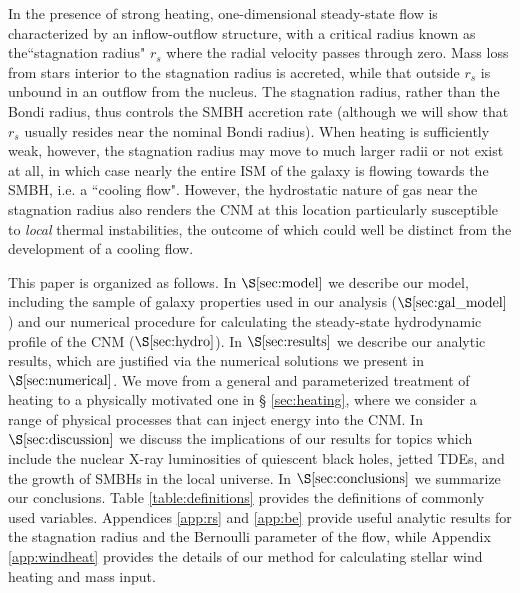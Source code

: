 \documentclass[usenatbib,fleqn]{mn2e}
\newcommand{\rs}{r_s}
\begin{document}
In the presence of strong heating, one-dimensional steady-state flow
is characterized by an inflow-outflow structure, with a critical
radius known as the``stagnation radius" $\rs$ where the radial
velocity passes through zero.  Mass loss from stars interior to the
stagnation radius is accreted, while that outside $\rs$ is unbound in
an outflow from the nucleus.  The stagnation radius, rather than the
Bondi radius, thus controls the SMBH accretion rate (although we will
show that $\rs$ usually resides near the nominal Bondi
radius).  When heating is sufficiently weak, however, the stagnation
radius may move to much larger radii or not exist at all, in which
case nearly the entire ISM of the galaxy is flowing towards the SMBH, i.e. a ``cooling flow".
However, the hydrostatic nature of gas near the stagnation radius also renders the CNM at this location particularly susceptible to {\it local} thermal instabilities, the outcome of which could well be distinct from the development of a cooling flow.       


This paper is organized as follows.  In $\S\ref{sec:model}$ we
describe our model, including the sample of galaxy properties used in
our analysis ($\S\ref{sec:gal_model}$) and our numerical procedure for
calculating the steady-state hydrodynamic profile of the CNM
($\S\ref{sec:hydro}$).  In $\S\ref{sec:results}$ we describe our
analytic results, which are justified via the numerical solutions we
present in $\S\ref{sec:numerical}$.  We move from a general and
parameterized treatment of heating to a physically motivated one in \S
\ref{sec:heating}, where we consider a range of physical processes
that can inject energy into the CNM.  In $\S\ref{sec:discussion}$ we
discuss the implications of our results for topics which include the
nuclear X-ray luminosities of quiescent black holes, jetted TDEs, and
the growth of SMBHs in the local universe.  In
$\S\ref{sec:conclusions}$ we summarize our conclusions.  Table
\ref{table:definitions} provides the definitions of commonly used
variables.  Appendices \ref{app:rs} and \ref{app:be} provide useful
analytic results for the stagnation radius and the Bernoulli parameter
of the flow, while Appendix \ref{app:windheat} provides the details of
our method for calculating stellar wind heating and mass input.
\end{document}
